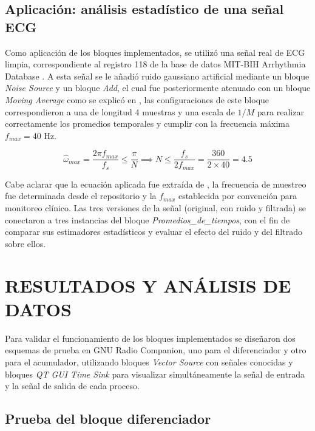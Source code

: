 \documentclass[twocolumn]{IEEEtran}
\begin{document}
\subsection{Aplicación: análisis estadístico de una señal ECG}

Como aplicación de los bloques implementados, se utilizó una señal real de ECG 
limpia, correspondiente al registro 118 de la base de datos MIT-BIH Arrhythmia 
Database \cite{moody2005mitdb}. A esta señal se le añadió ruido gaussiano 
artificial mediante un bloque \textit{Noise Source} y un bloque \textit{Add}, el 
cual fue posteriormente atenuado con un bloque \textit{Moving Average} como se explicó en \cite{tijaro2025timeaverages}, las configuraciones de este bloque correspondieron a una de longitud 
4 muestras y una escala de $1/M$ para realizar correctamente los promedios temporales y cumplir con la frecuencia máxima $f_{max}=40$ Hz.


\begin{equation}
    \hat{\omega}_{max} = \frac{2\pi f_{max}}{f_s} \leq \frac{\pi}{N} \implies N \leq \frac{f_s}{2 f_{max}} = \frac{360}{2 \times 40} = 4.5
\end{equation}

Cabe aclarar que la ecuación aplicada fue extraída de \cite{wavewalkerdsp2022ma}, la frecuencia de muestreo fue determinada desde el repositorio y la $f_{max}$ establecida por convención para monitoreo clínico. Las tres versiones de la señal (original, con ruido y filtrada) se 
conectaron a tres instancias del bloque \textit{Promedios\_de\_tiempos}, con el fin 
de comparar sus estimadores estadísticos y evaluar el efecto del ruido y del 
filtrado sobre ellos.



\section{RESULTADOS Y ANÁLISIS DE DATOS}

Para validar el funcionamiento de los bloques implementados se diseñaron dos 
esquemas de prueba en GNU Radio Companion, uno para el diferenciador y otro para 
el acumulador, utilizando bloques \textit{Vector Source} con señales conocidas y 
bloques \textit{QT GUI Time Sink} para visualizar simultáneamente la señal de 
entrada y la señal de salida de cada proceso.

\subsection{Prueba del bloque diferenciador}
\end{document}
